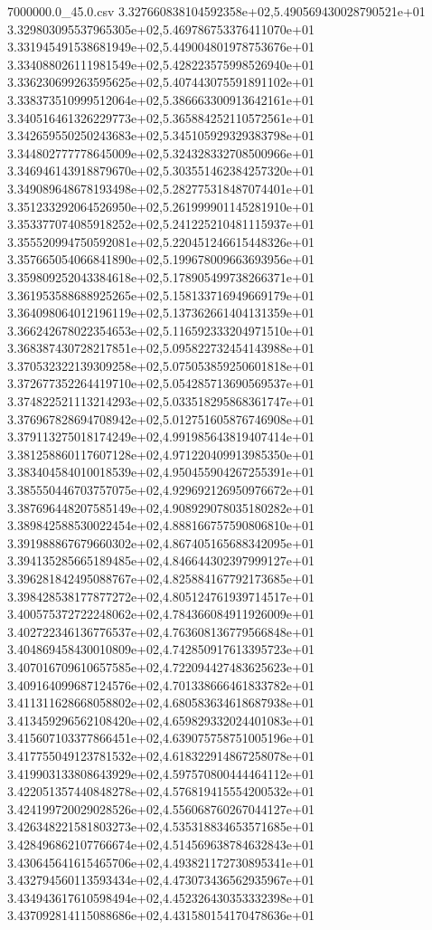 \begin{filecontents*}{7000000.0_45.0.csv}
3.327660838104592358e+02,5.490569430028790521e+01
3.329803095537965305e+02,5.469786753376411070e+01
3.331945491538681949e+02,5.449004801978753676e+01
3.334088026111981549e+02,5.428223575998526940e+01
3.336230699263595625e+02,5.407443075591891102e+01
3.338373510999512064e+02,5.386663300913642161e+01
3.340516461326229773e+02,5.365884252110572561e+01
3.342659550250243683e+02,5.345105929329383798e+01
3.344802777778645009e+02,5.324328332708500966e+01
3.346946143918879670e+02,5.303551462384257320e+01
3.349089648678193498e+02,5.282775318487074401e+01
3.351233292064526950e+02,5.261999901145281910e+01
3.353377074085918252e+02,5.241225210481115937e+01
3.355520994750592081e+02,5.220451246615448326e+01
3.357665054066841890e+02,5.199678009663693956e+01
3.359809252043384618e+02,5.178905499738266371e+01
3.361953588688925265e+02,5.158133716949669179e+01
3.364098064012196119e+02,5.137362661404131359e+01
3.366242678022354653e+02,5.116592333204971510e+01
3.368387430728217851e+02,5.095822732454143988e+01
3.370532322139309258e+02,5.075053859250601818e+01
3.372677352264419710e+02,5.054285713690569537e+01
3.374822521113214293e+02,5.033518295868361747e+01
3.376967828694708942e+02,5.012751605876746908e+01
3.379113275018174249e+02,4.991985643819407414e+01
3.381258860117607128e+02,4.971220409913985350e+01
3.383404584010018539e+02,4.950455904267255391e+01
3.385550446703757075e+02,4.929692126950976672e+01
3.387696448207585149e+02,4.908929078035180282e+01
3.389842588530022454e+02,4.888166757590806810e+01
3.391988867679660302e+02,4.867405165688342095e+01
3.394135285665189485e+02,4.846644302397999127e+01
3.396281842495088767e+02,4.825884167792173685e+01
3.398428538177877272e+02,4.805124761939714517e+01
3.400575372722248062e+02,4.784366084911926009e+01
3.402722346136776537e+02,4.763608136779566848e+01
3.404869458430010809e+02,4.742850917613395723e+01
3.407016709610657585e+02,4.722094427483625623e+01
3.409164099687124576e+02,4.701338666461833782e+01
3.411311628668058802e+02,4.680583634618687938e+01
3.413459296562108420e+02,4.659829332024401083e+01
3.415607103377866451e+02,4.639075758751005196e+01
3.417755049123781532e+02,4.618322914867258078e+01
3.419903133808643929e+02,4.597570800444464112e+01
3.422051357440848278e+02,4.576819415554200532e+01
3.424199720029028526e+02,4.556068760267044127e+01
3.426348221581803273e+02,4.535318834653571685e+01
3.428496862107766674e+02,4.514569638784632843e+01
3.430645641615465706e+02,4.493821172730895341e+01
3.432794560113593434e+02,4.473073436562935967e+01
3.434943617610598494e+02,4.452326430353332398e+01
3.437092814115088686e+02,4.431580154170478636e+01

\end{filecontents*}

